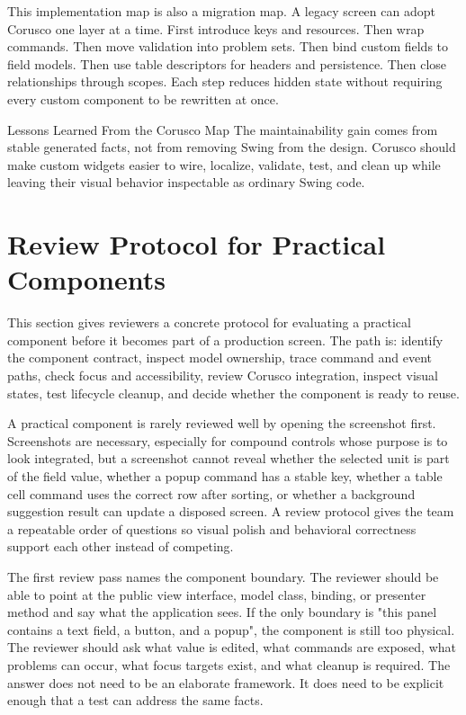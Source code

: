 This implementation map is also a migration map. A legacy screen can adopt
Corusco one layer at a time. First introduce keys and resources. Then wrap
commands. Then move validation into problem sets. Then bind custom fields to
field models. Then use table descriptors for headers and persistence. Then
close relationships through scopes. Each step reduces hidden state without
requiring every custom component to be rewritten at once.

\begin{principlebox}{Lessons Learned From the Corusco Map}
The maintainability gain comes from stable generated facts, not from removing
Swing from the design. Corusco should make custom widgets easier to wire,
localize, validate, test, and clean up while leaving their visual behavior
inspectable as ordinary Swing code.
\end{principlebox}

\section{Review Protocol for Practical Components}

\begin{roadmapbox}
This section gives reviewers a concrete protocol for evaluating a practical
component before it becomes part of a production screen. The path is: identify
the component contract, inspect model ownership, trace command and event paths,
check focus and accessibility, review Corusco integration, inspect visual states,
test lifecycle cleanup, and decide whether the component is ready to reuse.
\end{roadmapbox}

A practical component is rarely reviewed well by opening the screenshot first.
Screenshots are necessary, especially for compound controls whose purpose is to
look integrated, but a screenshot cannot reveal whether the selected unit is
part of the field value, whether a popup command has a stable key, whether a
table cell command uses the correct row after sorting, or whether a background
suggestion result can update a disposed screen. A review protocol gives the
team a repeatable order of questions so visual polish and behavioral correctness
support each other instead of competing.

The first review pass names the component boundary. The reviewer should be able
to point at the public view interface, model class, binding, or presenter method
and say what the application sees. If the only boundary is "this panel contains a
text field, a button, and a popup", the component is still too physical. The
reviewer should ask what value is edited, what commands are exposed, what
problems can occur, what focus targets exist, and what cleanup is required. The
answer does not need to be an elaborate framework. It does need to be explicit
enough that a test can address the same facts.

